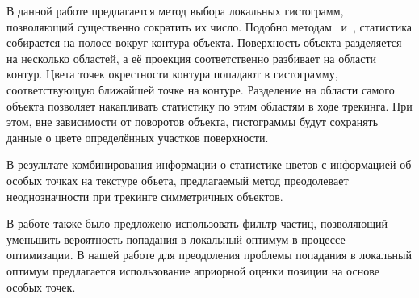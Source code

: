 В данной работе предлагается метод выбора локальных гистограмм, позволяющий
существенно сократить их число.
Подобно методам~\cite{Hexner2016,Tjaden2017,Tjaden2018}
и~\cite{Zhong2018}, статистика собирается на полосе вокруг контура объекта.
Поверхность объекта разделяется на несколько областей, а её проекция
соответственно разбивает на области контур.
Цвета точек окрестности контура попадают в гистограмму, соответствующую
ближайшей точке на контуре.
Разделение на области самого объекта позволяет накапливать статистику по этим
областям в ходе трекинга.
При этом, вне зависимости от поворотов объекта, гистограммы будут сохранять
данные о цвете определённых участков поверхности.

В результате комбинирования информации о статистике цветов с информацией об
особых точках на текстуре объета, предлагаемый метод преодолевает
неоднозначности при трекинге симметричных объектов.

В работе \cite{Zhao2014} также было предложено использовать фильтр частиц,
позволяющий уменьшить вероятность попадания в локальный оптимум в процессе
оптимизации.
В нашей работе для преодоления проблемы попадания в локальный оптимум
предлагается использование априорной оценки позиции на основе особых точек.
